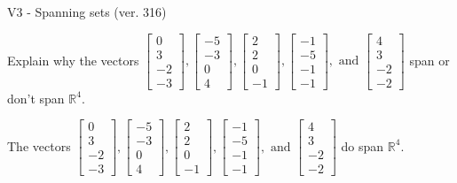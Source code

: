 \begin{exercise}
  \begin{exerciseTitle}V3 - Spanning sets (ver. 316)\end{exerciseTitle}
  \begin{exerciseStatement}
    Explain why the vectors \(\left[\begin{array}{r}
0 \\
3 \\
-2 \\
-3
\end{array}\right] , \left[\begin{array}{r}
-5 \\
-3 \\
0 \\
4
\end{array}\right] , \left[\begin{array}{r}
2 \\
2 \\
0 \\
-1
\end{array}\right] , \left[\begin{array}{r}
-1 \\
-5 \\
-1 \\
-1
\end{array}\right] , \text{ and } \left[\begin{array}{r}
4 \\
3 \\
-2 \\
-2
\end{array}\right]\) span or don't span \(\mathbb{R}^4\). 
	


  \end{exerciseStatement}
  \begin{exerciseAnswer}
   The vectors \(\left[\begin{array}{r}
0 \\
3 \\
-2 \\
-3
\end{array}\right] , \left[\begin{array}{r}
-5 \\
-3 \\
0 \\
4
\end{array}\right] , \left[\begin{array}{r}
2 \\
2 \\
0 \\
-1
\end{array}\right] , \left[\begin{array}{r}
-1 \\
-5 \\
-1 \\
-1
\end{array}\right] , \text{ and } \left[\begin{array}{r}
4 \\
3 \\
-2 \\
-2
\end{array}\right]\) 
  	 do  
	span \(\mathbb{R}^4\).
  



\end{exerciseAnswer}
\end{exercise}

